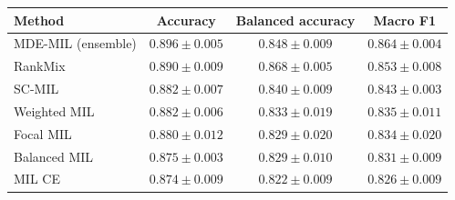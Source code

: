 \begin{tabular}{lccc}
\toprule
Method & Accuracy & Balanced accuracy & Macro F1\\
\midrule
MDE-MIL (ensemble) & $\num{0.896} \pm \num{0.005}$ & $\num{0.848} \pm \num{0.009}$ & $\num{0.864} \pm \num{0.004}$\\
RankMix & $\num{0.890} \pm \num{0.009}$ & $\num{0.868} \pm \num{0.005}$ & $\num{0.853} \pm \num{0.008}$\\
SC-MIL & $\num{0.882} \pm \num{0.007}$ & $\num{0.840} \pm \num{0.009}$ & $\num{0.843} \pm \num{0.003}$\\
Weighted MIL & $\num{0.882} \pm \num{0.006}$ & $\num{0.833} \pm \num{0.019}$ & $\num{0.835} \pm \num{0.011}$\\
Focal MIL & $\num{0.880} \pm \num{0.012}$ & $\num{0.829} \pm \num{0.020}$ & $\num{0.834} \pm \num{0.020}$\\
Balanced MIL & $\num{0.875} \pm \num{0.003}$ & $\num{0.829} \pm \num{0.010}$ & $\num{0.831} \pm \num{0.009}$\\
MIL CE & $\num{0.874} \pm \num{0.009}$ & $\num{0.822} \pm \num{0.009}$ & $\num{0.826} \pm \num{0.009}$\\
\bottomrule
\end{tabular}
